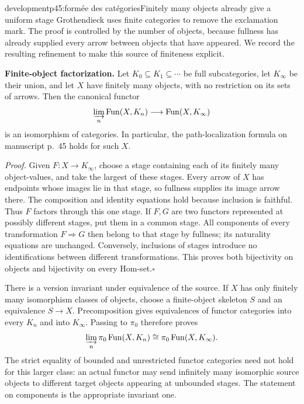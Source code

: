 \begin{dcomment}{development}{p45:formée des catégories}{Finitely many objects already give a uniform stage}
Grothendieck uses finite categories to remove the exclamation mark. The proof is controlled by the number of objects, because fullness has already supplied every arrow between objects that have appeared. We record the resulting refinement to make this source of finiteness explicit.

\textbf{Finite-object factorization.}\ours\quad
Let $K_0\subseteq K_1\subseteq\cdots$ be full subcategories, let $K_\infty$ be their union, and let $X$ have finitely many objects, with no restriction on its sets of arrows. Then the canonical functor
\[
 \varinjlim_n\operatorname{Fun}(X,K_n)
       \longrightarrow\operatorname{Fun}(X,K_\infty)
\]
is an isomorphism of categories. In particular, the path-localization formula on manuscript p.~45 holds for such $X$.

\textit{Proof.} Given $F:X\to K_\infty$, choose a stage containing each of its finitely many object-values, and take the largest of these stages. Every arrow of $X$ has endpoints whose images lie in that stage, so fullness supplies its image arrow there. The composition and identity equations hold because inclusion is faithful. Thus $F$ factors through this one stage. If $F,G$ are two functors represented at possibly different stages, put them in a common stage. All components of every transformation $F\Rightarrow G$ then belong to that stage by fullness; its naturality equations are unchanged. Conversely, inclusions of stages introduce no identifications between different transformations. This proves both bijectivity on objects and bijectivity on every Hom-set.\hfill$\square$

There is a version invariant under equivalence of the source. If $X$ has only finitely many isomorphism classes of objects, choose a finite-object skeleton $S$ and an equivalence $S\to X$. Precomposition gives equivalences of functor categories into every $K_n$ and into $K_\infty$. Passing to $\pi_0$ therefore proves
\[
 \varinjlim_n\pi_0\operatorname{Fun}(X,K_n)
       \cong\pi_0\operatorname{Fun}(X,K_\infty).
\]
The strict equality of bounded and unrestricted functor categories need not hold for this larger class: an actual functor may send infinitely many isomorphic source objects to different target objects appearing at unbounded stages. The statement on components is the appropriate invariant one.


\end{dcomment}
